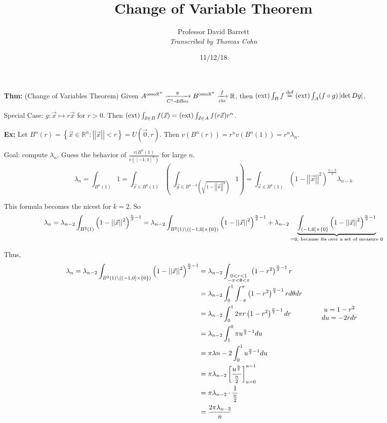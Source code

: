 \documentclass[10pt,letterpaper]{article}
\author{Professor David Barrett\\ \small\textit{Transcribed by Thomas Cohn}}
\title{Change of Variable Theorem}
\date{11/12/18} %
\newcommand{\n}{\hfill\break}
\newcommand{\thm}[1]{\par\noindent\settowidth{\hangindent}{\textbf{Thm: }}\textbf{Thm: }#1\n}
\newcommand{\ex}[1]{\par\noindent\settowidth{\hangindent}{\textbf{Ex: }}\textbf{Ex: }#1\n}
\newcommand{\ptxt}[1]{\textrm{\textnormal{#1}}}
\newcommand{\set}[1]{\left\{#1\right\}}
\newcommand{\reals}{\mathbb{R}}
\newcommand{\R}{\reals}
\newcommand{\cut}{\setminus}
\newcommand{\abs}[1]{\left|#1\right|}
\newcommand{\of}{\circ}
\newcommand{\norm}[1]{\abs{\abs{#1}}}
\newcommand{\paren}[1]{\left(#1\right)}
\renewcommand{\brack}[1]{\left[#1\right]}
\begin{document}
\maketitle
\setlength\RaggedRightParindent{\parindent}
\RaggedRight

\thm{(Change of Variables Theorem) Given $A^{\ptxt{osso}\R^{n}}\xrightarrow[C^{1}\ptxt{-diffeo}]{g}B^{\ptxt{osso}\R^{n}}\xrightarrow[\ptxt{cts}]{f}\R$, then $(\ptxt{ext})\int_{B}f\overset{\ptxt{def}}{=}(\ptxt{ext})\int_{A}(f\of{}g)\abs{\det{}Dg}$.}

\par\noindent Special Case: $g:\vec{x}\mapsto{}r\vec{x}$ for $r>0$. Then $(\ptxt{ext})\int_{\vec{x}\in{}B}f(\vec{x})=(\ptxt{ext})\int_{\vec{x}\in{}A}f(r\vec{x})r^{n}$.\n

\ex{Let $B^{n}(r)=\set{\vec{x}\in\R^{n}:\norm{\vec{x}}<r}=U(\vec{0},r)$.\n
Then $v(B^{n}(r))=r^{n}v(B^{n}(1))=r^{n}\lambda_{n}$.}

\par\noindent Goal: compute $\lambda_{n}$. Guess the behavior of $\frac{v(B^{n}(1)}{v([-1,1]^{n})}$ for large $n$.
\[
\lambda_{n}=\int_{B^{n}(1)}1=\int_{\vec{x}\in{}B^{k}(1)}\paren{\;\int_{\vec{y}\in{}B^{n-k}(\sqrt{1-\norm{\vec{x}}^{2}})}1}=\int_{\vec{x}\in{}B^{k}(1)}\paren{1-\norm{\vec{x}}^{2}}^{\frac{n-k}{2}}\lambda_{n-k}
\]

\par\noindent This formula becomes the nicest for $k=2$. So
\[
\lambda_{n}=\lambda_{n-2}\int_{B^{2}(1)}\paren{1-\norm{\vec{x}}^{2}}^{\frac{n}{2}-1}=\lambda_{n-2}\int_{B^{2}(1)\cut((-1,0]\times\set{0})}\paren{1-\norm{\vec{x}}^{2}}^{\frac{n}{2}-1}+\lambda_{n-2}\underbrace{\int_{(-1,0]\times\set{0}}\paren{1-\norm{\vec{x}}^{2}}^{\frac{n}{2}-1}}_{=0\ptxt{, because its over a set of measure $0$}}
\]

\par\noindent Thus,
\begin{align*}
\lambda_{n}=\lambda_{n-2}\int_{B^{2}(1)\cut((-1,0]\times\set{0})}\paren{1-\norm{\vec{x}}^{2}}^{\frac{n}{2}-1} & =\lambda_{n-2}\int_{\begin{subarray}{c}0<r<1\\ -\pi<\theta<\pi\end{subarray}}\paren{1-r^{2}}^{\frac{n}{2}-1}r\\
 & =\lambda_{n-2}\int_{0}^{1}\int_{-\pi}^{\pi}\paren{1-r^{2}}^{\frac{n}{2}-1}rd\theta{}dr\\
 & =\lambda_{n-2}\int_{0}^{1}2\pi{}r\paren{1-r^{2}}^{\frac{n}{2}-1}dr\qquad\qquad\begin{array}{c}u=1-r^{2}\\ du=-2rdr\end{array}\\
 & =\lambda_{n-2}\int_{1}^{0}\pi{}u^{\frac{n}{2}-1}du\\
 & =\pi\lambda{n-2}\int_{0}^{1}u^{\frac{n}{2}-1}du\\
 & =\pi\lambda_{n-2}\brack{\frac{u^{\frac{n}{2}}}{\frac{n}{2}}}_{u=0}^{u=1}\\
 & =\pi\lambda_{n-2}\cdot\frac{1}{\frac{n}{2}}\\
 & =\frac{2\pi\lambda_{n-2}}{n}
\end{align*}
\end{document}
